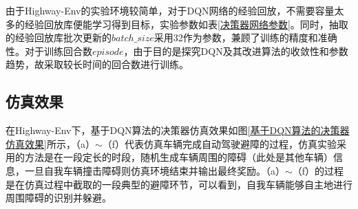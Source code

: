 由于Highway-Env的实验环境较简单，对于DQN网络的经验回放，不需要容量太多的经验回放库便能学习得到目标，实验参数如表\ref{决策器网络参数}。同时，抽取的经验回放库批次更新的$batch\_size$采用32作为参数，兼顾了训练的精度和准确性。对于训练回合数$episode$，由于目的是探究DQN及其改进算法的收敛性和参数趋势，故采取较长时间的回合数进行训练。

\subsection{仿真效果}

在Highway-Env下，基于DQN算法的决策器仿真效果如图\ref{基于DQN算法的决策器仿真效果}所示，（a）$\sim$（f）代表仿真车辆完成自动驾驶避障的过程，仿真实验采用的方法是在一段定长的时段，随机生成车辆周围的障碍（此处是其他车辆）信息，一旦自我车辆撞击障碍则仿真环境结束并输出最终奖励。（a）$\sim$（f）的过程是在仿真过程中截取的一段典型的避障环节，可以看到，自我车辆能够自主地进行周围障碍的识别并躲避。

